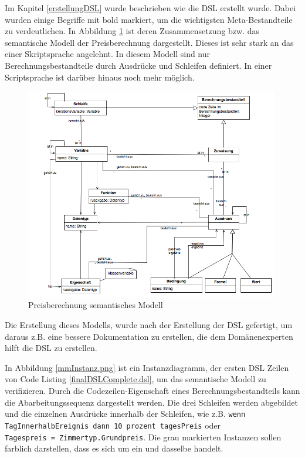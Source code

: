 \documentclass[11pt,english,ngerman, headsepline]{scrreprt}
\begin{document}
Im Kapitel \ref{erstellungDSL} wurde beschrieben wie die DSL erstellt wurde.
Dabei wurden einige Begriffe mit bold markiert, um die wichtigsten
Meta-Bestandteile zu verdeutlichen. In Abbildung \ref{mm.png}
ist deren Zusammensetzung bzw. das semantische Modell der Preisberechnung
dargestellt.
Dieses ist sehr stark an das einer Skriptsprache angelehnt.
In diesem Modell sind nur Berechnungsbestandteile durch Ausdrücke und Schleifen
definiert. In einer Scriptsprache ist darüber hinaus noch mehr möglich.
 
\begin{figure}[h!]
	\begin{center}
	\includegraphics[width=0.99\textwidth]{pics/mm}
	\end{center}
	\caption{Preisberechnung semantisches Modell}
	\label{mm.png}
\end{figure}

Die Erstellung dieses Modells, wurde nach der Erstellung der DSL gefertigt, um
daraus z.B. eine bessere Dokumentation zu erstellen, die dem Domänenexperten
hilft die DSL zu erstellen.
  
In Abbildung \ref{mmInstanz.png} ist ein Instanzdiagramm, der ersten DSL
Zeilen von Code Listing \ref{finalDSLComplete.dsl}, um das semantische Modell zu
verifizieren.
Durch die Codezeilen-Eigenschaft eines Berechnungsbestandteils kann die
Abarbeitungssequenz dargestellt werden. Die drei Schleifen werden abgebildet und
die einzelnen Ausdrücke innerhalb der Schleifen, wie z.B. \texttt{wenn
TagInnerhalbEreignis dann 10 prozent tagesPreis} oder\\ \texttt{Tagespreis =
Zimmertyp.Grundpreis}. Die grau markierten Instanzen sollen farblich darstellen,
dass es sich um ein und dasselbe handelt. 
\end{document}
